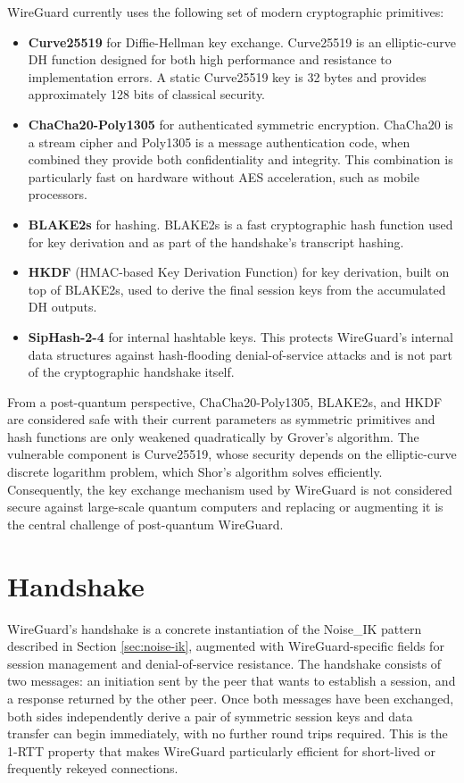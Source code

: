 WireGuard currently uses the following set of modern cryptographic primitives:
\begin{itemize}
    \item \textbf{Curve25519} for Diffie-Hellman key exchange. Curve25519 is an elliptic-curve DH function designed for both high performance and resistance to implementation errors. A static Curve25519 key is 32 bytes and provides approximately 128 bits of classical security.
    \item \textbf{ChaCha20-Poly1305} for authenticated symmetric encryption. ChaCha20 is a stream cipher and Poly1305 is a message authentication code, when combined they provide both confidentiality and integrity. This combination is particularly fast on hardware without AES acceleration, such as mobile processors.
    \item \textbf{BLAKE2s} for hashing. BLAKE2s is a fast cryptographic hash function used for key derivation and as part of the handshake's transcript hashing.
    \item \textbf{HKDF} (HMAC-based Key Derivation Function) for key derivation, built on top of BLAKE2s, used to derive the final session keys from the accumulated DH outputs.
    \item \textbf{SipHash-2-4} for internal hashtable keys. This protects WireGuard's internal data structures against hash-flooding denial-of-service attacks and is not part of the cryptographic handshake itself.
\end{itemize}

From a post-quantum perspective, ChaCha20-Poly1305, BLAKE2s, and HKDF are considered safe with their current parameters as symmetric primitives and hash functions are only weakened quadratically by Grover's algorithm. The vulnerable component is Curve25519, whose security depends on the elliptic-curve discrete logarithm problem, which Shor's algorithm solves efficiently. Consequently, the key exchange mechanism used by WireGuard is not considered secure against large-scale quantum computers and replacing or augmenting it is the central challenge of post-quantum WireGuard.

\section{Handshake}\label{sec:wg-handshake}
WireGuard's handshake is a concrete instantiation of the Noise\_IK pattern described in Section \ref{sec:noise-ik}, augmented with WireGuard-specific fields for session management and denial-of-service resistance. The handshake consists of two messages: an initiation sent by the peer that wants to establish a session, and a response returned by the other peer. Once both messages have been exchanged, both sides independently derive a pair of symmetric session keys and data transfer can begin immediately, with no further round trips required. This is the 1-RTT property that makes WireGuard particularly efficient for short-lived or frequently rekeyed connections.

